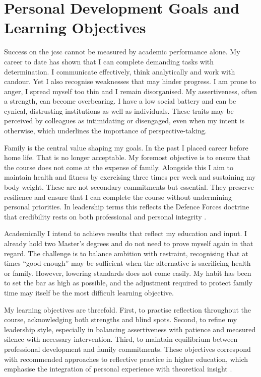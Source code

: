 \chapter{Personal Development Goals and Learning Objectives}

Success on the \gls{jcsc} cannot be measured by academic performance alone. My career to date has shown that I can complete demanding tasks with determination. I communicate effectively, think analytically and work with candour. Yet I also recognise weaknesses that may hinder progress. I am prone to anger, I spread myself too thin and I remain disorganised. My assertiveness, often a strength, can become overbearing. I have a low social battery and can be cynical, distrusting institutions as well as individuals. These traits may be perceived by colleagues as intimidating or disengaged, even when my intent is otherwise, which underlines the importance of perspective-taking.  

Family is the central value shaping my goals. In the past I placed career before home life. That is no longer acceptable. My foremost objective is to ensure that the course does not come at the expense of family. Alongside this I aim to maintain health and fitness by exercising three times per week and sustaining my body weight. These are not secondary commitments but essential. They preserve resilience and ensure that I can complete the course without undermining personal priorities. In leadership terms this reflects the Defence Forces doctrine that credibility rests on both professional and personal integrity \parencite{DFDOCTRINE_2023}.  

Academically I intend to achieve results that reflect my education and input. I already hold two Master’s degrees and do not need to prove myself again in that regard. The challenge is to balance ambition with restraint, recognising that at times “good enough” may be sufficient when the alternative is sacrificing health or family. However, lowering standards does not come easily. My habit has been to set the bar as high as possible, and the adjustment required to protect family time may itself be the most difficult learning objective.  

My learning objectives are threefold. First, to practise reflection throughout the course, acknowledging both strengths and blind spots. Second, to refine my leadership style, especially in balancing assertiveness with patience and measured silence with necessary intervention. Third, to maintain equilibrium between professional development and family commitments. These objectives correspond with recommended approaches to reflective practice in higher education, which emphasise the integration of personal experience with theoretical insight \parencite{MOON_2004}.  

